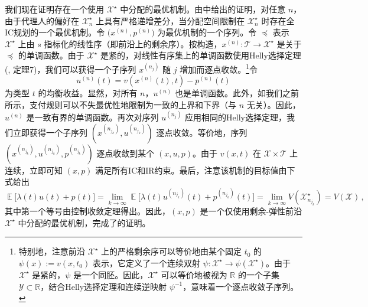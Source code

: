 \documentclass[12pt,letterpaper]{article}
\newenvironment{translation}{\color{blue}\noindent}{}
\theoremstyle{plain}
\theoremstyle{definition}
\theoremstyle{remark}
\DeclareMathOperator{\E}{\mathds{E}}
\newcommand{\R}{\mathds{R}}
\newcommand{\Y}{\mathcal{Y}}
\renewcommand{\1}{\mathds{1}}
\newcommand{\X}{\mathcal{X}}
\theoremstyle{definition}
\begin{document}
\begin{translation}
我们现在证明存在一个使用 $\X^\star$ 中分配的最优机制。由中给出的证明，对任意 $n$，由于代理人的偏好在 $\X^\star_n$ 上具有严格递增差分，当分配空间限制在 $\X^\star_n$ 时存在全IC规划的一个最优机制。令 $\big(x^{(n)}, p^{(n)}\big)$ 为最优机制的一个序列。令 $\preceq$ 表示 $\X^\star$ 上由 $s$ 指标化的线性序（即前沿上的剩余序）。按构造，$x^{(n)}: \mathcal{T} \rightarrow \X^\star$ 是关于 $\preceq$ 的单调函数。由于 $\X^\star$ 是紧的，对线性有序集上的单调函数使用Helly选择定理(\citealt{fuchino1999theorem}, 定理7)，我们可以获得一个子序列 $x^{(n_j)}$ 随 $j$ 增加而逐点收敛。\footnote{特别地，注意前沿 $\X^\star$ 上的严格剩余序可以等价地由某个固定 $t_0$ 的 $\psi(x) := v(x, t_0)$ 表示，它定义了一个连续双射 $\psi: \X^\star \rightarrow \psi(\X^\star)$。由于 $\X^\star$ 是紧的，$\psi$ 是一个同胚。因此，$\X^\star$ 可以等价地被视为 $\R$ 的一个子集 $\Y \subset \R$，结合Helly选择定理和连续逆映射 $\psi^{-1}$，意味着一个逐点收敛子序列。}令
\[u^{(n)}(t) = v(x^{(n)}(t), t) - p^{(n)}(t)\]
为类型 $t$ 的均衡收益。显然，对所有 $n$，$u^{(n)}$ 也是单调函数。此外，如我们之前所示，支付规则可以不失最优性地限制为一致的上界和下界（与 $n$ 无关）。因此，$u^{(n)}$ 是一致有界的单调函数。再次对序列 $u^{(n_j)}$ 应用相同的Helly选择定理，我们立即获得一个子序列 $(x^{(n_{j_k})}, u^{(n_{j_k})})$ 逐点收敛。等价地，序列 $(x^{(n_{j_k})}, u^{(n_{j_k})}, p^{(n_{j_k})})$ 逐点收敛到某个 $(x, u, p)$。由于 $v(x, t)$ 在 $\X \times \mathcal{T}$ 上连续，立即可知 $(x, p)$ 满足所有IC和IR约束。最后，注意该机制的目标值由下式给出
\[\E\big[\lambda(t) u(t) + p(t)\big] = \lim_{k \rightarrow \infty }\E\big[\lambda(t) u^{(n_{j_k})}(t) + p^{(n_{j_k})}(t)\big] = \lim_{k \rightarrow \infty} V(\X^\star_{n_{j_k}}) = V(\X)\,,\]
其中第一个等号由控制收敛定理得出。因此，$(x, p)$ 是一个仅使用剩余-弹性前沿 $\X^\star$ 中分配的最优机制，完成了的证明。
\end{translation}
\end{document}
